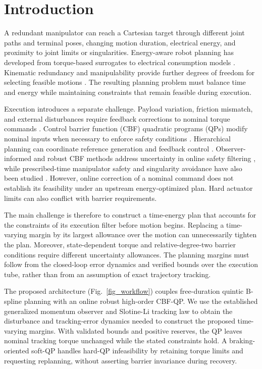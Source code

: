 \section{Introduction}

A redundant manipulator can reach a Cartesian target through different joint paths and terminal poses, changing motion duration, electrical energy, and proximity to joint limits or singularities. Energy-aware robot planning has developed from torque-based surrogates \cite{r1} to electrical consumption models \cite{r2,r3,r4}. Kinematic redundancy and manipulability provide further degrees of freedom for selecting feasible motions \cite{r5,r6}. The resulting planning problem must balance time and energy while maintaining constraints that remain feasible during execution.

Execution introduces a separate challenge. Payload variation, friction mismatch, and external disturbances require feedback corrections to nominal torque commands \cite{r16,r18}. Control barrier function (CBF) quadratic programs (QPs) modify nominal inputs when necessary to enforce safety conditions \cite{r7,r8}. Hierarchical planning can coordinate reference generation and feedback control \cite{r15}. Observer-informed and robust CBF methods address uncertainty in online safety filtering \cite{r9,r10,r11,r12}, while prescribed-time manipulator safety and singularity avoidance have also been studied \cite{r13,r14}. However, online correction of a nominal command \cite{r9,r10} does not establish its feasibility under an upstream energy-optimized plan. Hard actuator limits can also conflict with barrier requirements.

The main challenge is therefore to construct a time-energy plan that accounts for the constraints of its execution filter before motion begins. Replacing a time-varying margin by its largest allowance over the motion can unnecessarily tighten the plan. Moreover, state-dependent torque and relative-degree-two barrier conditions require different uncertainty allowances. The planning margins must follow from the closed-loop error dynamics and verified bounds over the execution tube, rather than from an assumption of exact trajectory tracking.

The proposed architecture (Fig.~\ref{fig_workflow}) couples free-duration quintic B-spline planning with an online robust high-order CBF-QP. We use the established generalized momentum observer \cite{r17} and Slotine-Li tracking law \cite{r18} to obtain the disturbance and tracking-error dynamics needed to construct the proposed time-varying margins. With validated bounds and positive reserves, the QP leaves nominal tracking torque unchanged while the stated constraints hold. A braking-oriented soft-QP handles hard-QP infeasibility by retaining torque limits and requesting replanning, without asserting barrier invariance during recovery.

